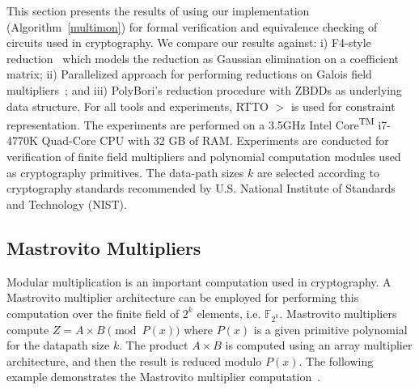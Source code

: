 This section presents the results of using our implementation
(Algorithm~\ref{multimon}) for formal verification and equivalence
checking of circuits used in cryptography. We compare our results
against: i) F4-style reduction~\cite{pruss:tcad} which models the
reduction as Gaussian elimination on a coefficient matrix;   ii)
Parallelized approach for performing reductions on Galois field 
multipliers~\cite{cunxi:aspdac17};  and iii) PolyBori's \cite{polybori:2009}
reduction procedure with ZBDDs as
underlying data structure. For all tools and experiments, RTTO $>$ is
used for constraint representation. 
 The experiments are performed on a 3.5GHz
Intel Core\textsuperscript{TM} i7-4770K Quad-Core CPU with 32 GB of
RAM. Experiments are conducted for verification of finite field
multipliers and polynomial computation modules used as cryptography
primitives. The data-path sizes {$k$} are selected according to
cryptography standards recommended by U.S. National Institute of
Standards and Technology (NIST). 

\subsection{Mastrovito Multipliers}

Modular multiplication is an important computation used in
cryptography. A Mastrovito multiplier architecture can be employed for
performing this computation over the finite field of $2^k$ elements,
i.e. $\mathbb{F}_{2^k}$. Mastrovito multipliers compute $Z = A\times B \pmod{
  P(x)}$ where $P(x)$ is a given primitive polynomial for the datapath size
$k$. The product $A \times B$ is computed using an array multiplier
architecture, and then the result is reduced modulo $P(x)$. The
following example demonstrates the Mastrovito multiplier
computation~\cite{lv:tcad2013}. 


